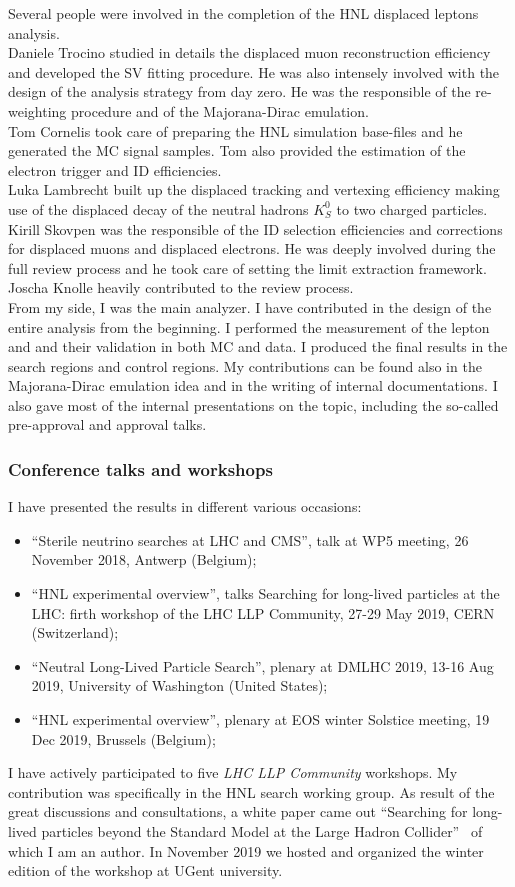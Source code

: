 Several people were involved in the completion of the HNL displaced leptons
analysis.\\
Daniele Trocino studied in details the displaced muon reconstruction
efficiency and developed the SV fitting procedure. He was also
intensely involved with the design of the analysis strategy from day zero. He was
the responsible of the re-weighting procedure and of the
Majorana-Dirac emulation.\\
Tom Cornelis took care of preparing the HNL simulation base-files and
he generated the MC signal samples. Tom also provided the estimation
of the electron trigger and ID efficiencies. \\
Luka Lambrecht built up the displaced tracking and vertexing
efficiency making use of the displaced decay of the neutral hadrons $K_S^{0}$ to
two charged particles.\\
Kirill Skovpen was the responsible of the ID selection efficiencies and
corrections for displaced muons and displaced electrons. He was deeply
involved during the full review process and he took care of setting
the limit extraction framework. \\
Joscha Knolle heavily contributed to the review process.\\
From my side, I was the main analyzer. I have contributed in the design of the
entire analysis from the beginning. I performed the measurement of the
lepton \fr and \Dfr and their validation in both MC and data. I
produced the final results in the search regions and control
regions. My contributions can be found also in the Majorana-Dirac
emulation idea and in the writing of internal documentations. I also
gave most of the internal presentations on the topic, including the
so-called pre-approval and approval talks.
\subsubsection*{Conference talks and workshops}
I have presented the results in different various occasions:
\begin{itemize}
\item ``Sterile neutrino searches at LHC and CMS'', talk at WP5
  meeting, 26 November 2018, Antwerp (Belgium);
\item ``HNL experimental overview'', talks Searching for long-lived
  particles at the LHC: firth workshop of the LHC LLP Community, 27-29
  May 2019, CERN (Switzerland);
\item ``Neutral Long-Lived Particle Search'', plenary at DM\@ LHC 2019, 13-16 Aug 2019, University of Washington (United States);
\item ``HNL experimental overview'', plenary at EOS winter Solstice
  meeting, 19 Dec 2019, Brussels (Belgium);
\end{itemize}

I have actively participated to five \emph{LHC LLP Community}
workshops. My contribution was specifically in the HNL search working
group. As result of the great discussions and consultations, a white
paper came out ``Searching for long-lived particles beyond the
Standard Model at the Large Hadron Collider''~\cite{Alimena_2020} of
which I am an author. In November 2019 we hosted and organized the winter edition
of the workshop at UGent university.